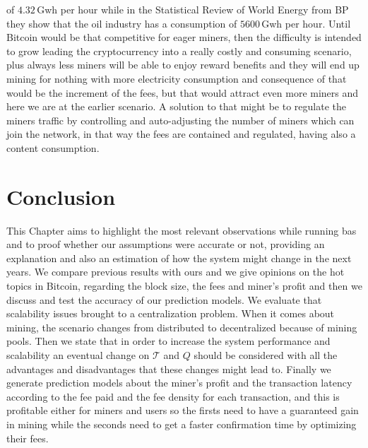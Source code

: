 \documentclass[USenglish]{uit-thesis}
\begin{document}
of $4.32$\,Gwh per hour while in the Statistical
Review of World Energy from BP\,\cite{BPSRWE2016}
they show that the oil industry has a consumption
of $5600$\,Gwh per hour. Until Bitcoin
would be that competitive for eager miners, then
the difficulty is intended to grow leading
the cryptocurrency into a really costly and
consuming scenario, plus always less miners
will be able to enjoy reward benefits and they will
end up mining for nothing with more
electricity consumption and consequence of that
would be the increment of the fees, but that would
attract even more miners and here we are at the earlier
scenario. A solution to that might be to regulate
the miners traffic
by controlling and auto-adjusting
the number of miners which
can join the network, in
that way the fees are contained and
regulated, having also a content consumption.

\chapter{Conclusion}
\label{chap:conclusion}
This Chapter aims to highlight the most relevant
observations while running \gls{bas}
and to proof whether our assumptions were
accurate or not, providing an explanation and also an
estimation of how the system might change in the next years.
We compare previous results with ours and we give
opinions on the hot topics in Bitcoin, regarding
the block size, the fees and miner's profit and then we
discuss and test the accuracy of our prediction models.
We evaluate that scalability issues brought to a 
centralization problem. When it comes
about mining, the scenario changes from distributed
to decentralized because of mining pools.
Then we state that in order to increase
the system performance and
scalability an eventual change on $\mathcal{T}$
and $Q$ should be considered with all the
advantages and disadvantages that these changes
might lead to.
Finally we generate prediction models about the
miner's profit and the transaction latency according
to the fee paid and the fee density for each
transaction, and this is profitable either for
miners and users so the firsts need
to have a guaranteed gain in mining while
the seconds need to get a faster
confirmation time by optimizing
their fees.
\end{document}
